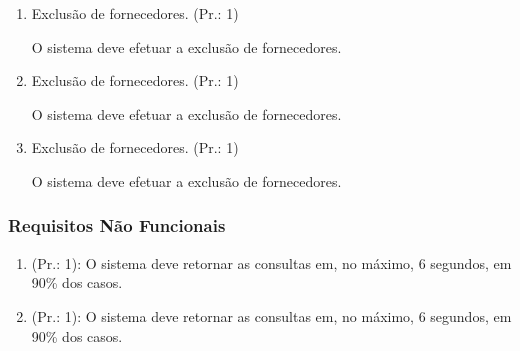 \begin{enumerate}[
	label=RF\arabic{*}, 
	ref=(RF\arabic{*}),
	leftmargin=1.5em,
	itemindent=4.5em]
\item Exclusão de fornecedores. (Pr.: 1)\par
O sistema deve efetuar a exclusão de fornecedores.\par

\item Exclusão de fornecedores. (Pr.: 1)\par
O sistema deve efetuar a exclusão de fornecedores.\par

\item Exclusão de fornecedores. (Pr.: 1)\par
O sistema deve efetuar a exclusão de fornecedores.\par


\end{enumerate}

\subsubsection{Requisitos Não Funcionais}



\begin{enumerate}[
	label=RNF\arabic{*}, 
	ref=(RNF\arabic{*}),
	leftmargin=1.5em,
	itemindent=4.5em]
\item (Pr.: 1): O sistema deve retornar as consultas em, no máximo, 6 segundos, em 90\% dos casos.
\item (Pr.: 1): O sistema deve retornar as consultas em, no máximo, 6 segundos, em 90\% dos casos.
\end{enumerate}
